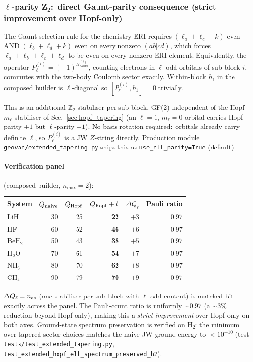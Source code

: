 \documentclass[aps,pra,twocolumn,superscriptaddress,longbibliography]{revtex4-2}
\begin{document}
\subsubsection{$\ell$-parity Z$_2$:\ direct Gaunt-parity consequence
(strict improvement over Hopf-only)}
\label{sec:ell_parity_tapering}

The Gaunt selection rule for the chemistry ERI requires
$(\ell_a + \ell_c + k)$ even AND $(\ell_b + \ell_d + k)$ even on
every nonzero $(ab|cd)$, which forces
$\ell_a + \ell_b + \ell_c + \ell_d$ to be even on every nonzero
ERI element.  Equivalently, the operator
$P_\ell^{(i)} = (-1)^{N_{\ell\text{-odd}}^{(i)}}$, counting electrons
in $\ell$-odd orbitals of sub-block $i$, commutes with the
two-body Coulomb sector exactly.  Within-block $h_1$ in the
composed builder is $\ell$-diagonal so $[P_\ell^{(i)}, h_1] = 0$
trivially.

This is an additional $\mathbb{Z}_2$ stabiliser per sub-block,
GF($2$)-independent of the Hopf $m_\ell$ stabiliser of
Sec.~\ref{sec:hopf_tapering} (an $\ell=1$, $m_\ell=0$ orbital
carries Hopf parity $+1$ but $\ell$-parity $-1$).  No basis
rotation required:\ orbitals already carry definite $\ell$, so
$P_\ell^{(i)}$ is a JW $Z$-string directly.  Production module
\texttt{geovac/extended\_tapering.py} ships this as
\texttt{use\_ell\_parity=True} (default).

\paragraph*{Verification panel} (composed builder, $n_{\max} = 2$):
\begin{center}
\begin{tabular}{lrrrrr}
System & $Q_{\rm naive}$ & $Q_{\rm Hopf}$ & $Q_{\rm Hopf}+\ell$ &
$\Delta Q_\ell$ & Pauli ratio \\
\hline
LiH    & 30 & 25 & \textbf{22} & $+3$ & $0.97$ \\
HF     & 60 & 52 & \textbf{46} & $+6$ & $0.97$ \\
BeH$_2$  & 50 & 43 & \textbf{38} & $+5$ & $0.97$ \\
H$_2$O   & 70 & 61 & \textbf{54} & $+7$ & $0.97$ \\
NH$_3$   & 80 & 70 & \textbf{62} & $+8$ & $0.97$ \\
CH$_4$   & 90 & 79 & \textbf{70} & $+9$ & $0.97$ \\
\end{tabular}
\end{center}
$\Delta Q_\ell = n_{\rm sb}$ (one stabiliser per sub-block with
$\ell$-odd content) is matched bit-exactly across the panel.  The
Pauli-count ratio is uniformly $\sim 0.97$ (a $\sim 3\%$ reduction
beyond Hopf-only), making this a \emph{strict improvement} over
Hopf-only on both axes.  Ground-state spectrum preservation is
verified on H$_2$: the minimum over tapered sector choices matches
the naive JW ground energy to $<10^{-10}$
(test \texttt{tests/test\_extended\_tapering.py},
\texttt{test\_extended\_hopf\_ell\_spectrum\_preserved\_h2}).
\end{document}
